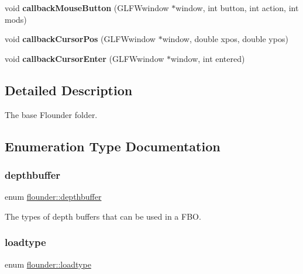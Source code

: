 \begin{DoxyCompactItemize}
\item 
\mbox{\label{namespaceflounder_a3914861bc871e4d237b5878fde9bcbbd}} 
void {\bfseries callback\+Mouse\+Button} (G\+L\+F\+Wwindow $\ast$window, int button, int action, int mods)
\item 
\mbox{\label{namespaceflounder_a84f436b17b1e87b7e8ff691b9ab0bb09}} 
void {\bfseries callback\+Cursor\+Pos} (G\+L\+F\+Wwindow $\ast$window, double xpos, double ypos)
\item 
\mbox{\label{namespaceflounder_ab637dcebaebff142804649b9136870d8}} 
void {\bfseries callback\+Cursor\+Enter} (G\+L\+F\+Wwindow $\ast$window, int entered)
\end{DoxyCompactItemize}


\subsection{Detailed Description}
The base Flounder folder. 



\subsection{Enumeration Type Documentation}
\mbox{\label{namespaceflounder_aed09c736167e783c910ec9e58479b57c}} 
\subsubsection{\texorpdfstring{depthbuffer}{depthbuffer}}
{\footnotesize\ttfamily enum \hyperlink{namespaceflounder_aed09c736167e783c910ec9e58479b57c}{flounder\+::depthbuffer}}



The types of depth buffers that can be used in a F\+BO. 

\mbox{\label{namespaceflounder_a69b4e6ffcd64f6175546ca0942d18565}} 
\subsubsection{\texorpdfstring{loadtype}{loadtype}}
{\footnotesize\ttfamily enum \hyperlink{namespaceflounder_a69b4e6ffcd64f6175546ca0942d18565}{flounder\+::loadtype}}



